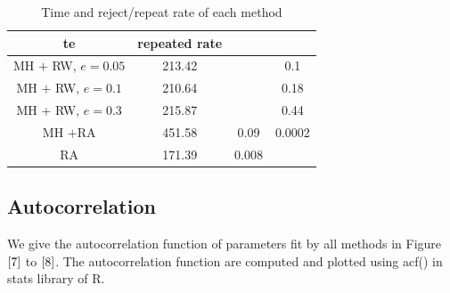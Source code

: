 \documentclass{article}
\begin{document}
\begin{table}
\begin{tabular}{|c|c|c|c|}
te& repeated rate  \\
\hline
MH $+$ RW, $e=0.05$ & 213.42 &  & 0.1\\
\hline
MH $+$ RW, $e=0.1$&  210.64 &  & 0.18 \\
\hline
MH $+$ RW, $e=0.3$ & 215.87 &  & 0.44\\
\hline
MH $+$RA & 451.58 & 0.09 & 0.0002\\
\hline
RA & 171.39 & 0.008 & \\
\hline
\end{tabular}
\caption{Time and reject/repeat rate of each method}\label{6}
\end{table}
\subsection{Autocorrelation}
We give the autocorrelation function of parameters fit by all methods in Figure $\ref{7}$ to $\ref{8}$. The autocorrelation function are computed and plotted using acf() in stats library of R.
\end{document}
